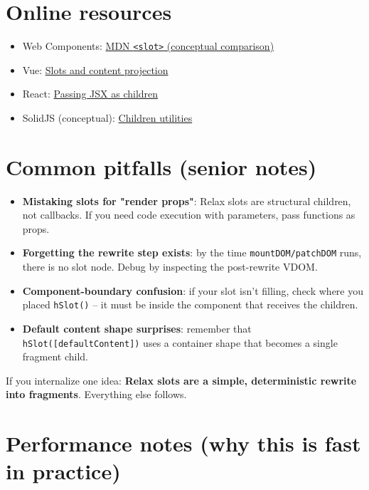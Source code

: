 \section{Online resources}

\begin{itemize}
  \item Web Components: \href{https://developer.mozilla.org/en-US/docs/Web/API/Web_components/Using_templates_and_slots}{MDN \texttt{<slot>} (conceptual comparison)}
  \item Vue: \href{https://vuejs.org/guide/components/slots.html}{Slots and content projection}
  \item React: \href{https://react.dev/learn/passing-props-to-a-component#passing-jsx-as-children}{Passing JSX as children}
  \item SolidJS (conceptual): \href{https://www.solidjs.com/docs/latest#children}{Children utilities}
\end{itemize}

\section{Common pitfalls (senior notes)}

\begin{itemize}
  \item \textbf{Mistaking slots for "render props"}: Relax slots are structural children, not callbacks. If you need code execution with parameters, pass functions as props.
  \item \textbf{Forgetting the rewrite step exists}: by the time \texttt{mountDOM/patchDOM} runs, there is no slot node. Debug by inspecting the post-rewrite VDOM.
  \item \textbf{Component-boundary confusion}: if your slot isn't filling, check where you placed \texttt{hSlot()} -- it must be inside the component that receives the children.
  \item \textbf{Default content shape surprises}: remember that \texttt{hSlot([defaultContent])} uses a container shape that becomes a single fragment child.
\end{itemize}

If you internalize one idea: \textbf{Relax slots are a simple, deterministic rewrite into fragments}. Everything else follows.

\section{Performance notes (why this is fast in practice)}


